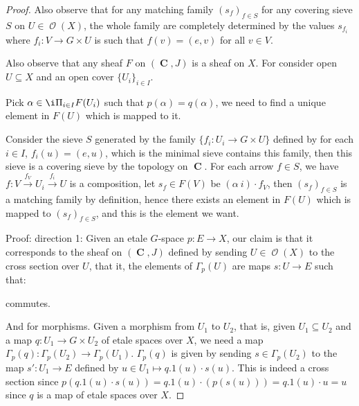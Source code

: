 \documentclass[a4paper]{article}
\DeclareMathOperator{\C}{\mathbf {C}}
\DeclareMathOperator{\mcO}{\mathcal {O}}
\begin{document}
\begin{proof}
    Also observe that for any matching family $(s_f)_{f\in S}$ for any covering sieve $S$ on $U\in \mcO(X)$, the whole family are completely determined by the values $s_{f_i}$ where $f_i:V\to G\times U$ is such that $f(v)=(e,v)$ for all $v\in V$.

    Also observe that any sheaf $F$ on $(\C,J)$ is a sheaf on $X$. For consider open $U\subseteq X$ and an open cover $\{U_i\}_{i\in I}$. 

    \begin{center}
    \end{center}

    Pick $\alpha\in \i \Pi_{i\in I}F(U_i)$ such that $p(\alpha) = q(\alpha)$, we need to find a unique element in $F(U)$ which is mapped to it. 

    Consider the sieve $S$ generated by the family $\{f_i:U_i\to G\times U\}$ defined by for each $i\in I$, $f_i(u)=(e,u)$, which is the minimal sieve contains this family, then this sieve is a covering sieve by the topology on $\C$. For each arrow $f\in S$, we have $f:V\overset{f_V}\to U_i \overset{f_i}\to U$ is a composition, let $s_f\in F(V)$ be $(\alpha \ i)\cdot f_V$, then $(s_f)_{f\in S}$ is a matching family by definition, hence there exists an element in $F(U)$ which is mapped to $(s_f)_{f\in S}$, and this is the element we want.
    
    
    
    Proof: 
    direction 1: Given an etale $G$-space $p: E\to X$, our claim is that it corresponds to the sheaf on $(\C,J)$ defined by sending $U\in \mcO (X)$ to the cross section over $U$, that it, the elements of $\Gamma_p(U)$ are maps $s: U\to E$ such that:

    \begin{center}
    \end{center}
    
    commutes.

    And for morphisms. Given a morphism from $U_1$ to $U_2$, that is, given $U_1\subseteq U_2$ and a map $q:U_1\to G\times U_2$ of etale spaces over $X$, we need a map $\Gamma_p(q):\Gamma_p(U_2)\to \Gamma_p(U_1)$. $\Gamma_p(q)$ is given by sending $s\in \Gamma_p(U_2)$ to the map $s':U_1\to E$ defined by $u\in U_1\mapsto q.1(u)\cdot s(u)$. This is indeed a cross section since $p(q.1(u)\cdot s(u))=q.1(u)\cdot (p(s(u)))=q.1(u)\cdot u = u$ since $q$ is a map of etale spaces over $X$. 
    

\end{proof}
\end{document}
